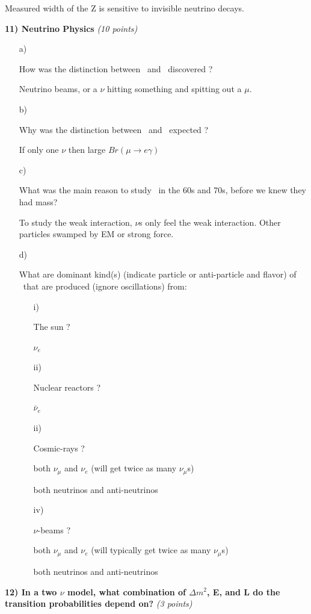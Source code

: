 {\bc
Measured width of the Z is sensitive to invisible neutrino decays.
\ec

\textbf{11) Neutrino Physics } \hfill \textit{(10 points)}\\
\begin{itemize}
\item[a)]{How was the distinction between \numu\ and \nue\ discovered ?

Neutrino beams, or a $\nu$ hitting something and spitting out a $\mu$.

}

\item[b)]{Why was the distinction between \numu\ and \nue\  expected ?

If only one $\nu$ then large $Br(\mu \rightarrow e \gamma)$

}
\item[c)]{What was the main reason to study \nus\ in the 60s and 70s, before we knew they had mass?

To study the weak interaction, $\nu$s only feel the weak interaction. Other particles swamped by EM or strong force.

}
\item[d)]{What are dominant kind(s) (indicate particle or anti-particle and flavor) of \nus\ that are produced (ignore oscillations) from:
\begin{itemize}
\item[i)]{ The sun ? 

$\nu_e$

} 
\item[ii)]{Nuclear reactors ? 

$\bar{\nu}_e$

}
\item[ii)]{Cosmic-rays ? 

both $\nu_\mu$ and $\nu_e$ 
(will get twice as many $\nu_\mu$s)

both neutrinos and anti-neutrinos

}
\item[iv)]{$\nu$-beams ?

both $\nu_\mu$ and $\nu_e$ 
(will typically get twice as many $\nu_\mu$s)

both neutrinos and anti-neutrinos

}
\end{itemize}
}
\end{itemize}


\textbf{12) In a two $\nu$ model, what combination of $\Delta m^2$, E, and L do the transition probabilities depend on?  } \hfill \textit{(3 points)}\\

}
